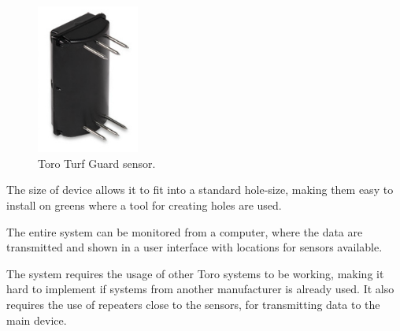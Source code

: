 \begin{figure}
\begin{center}
\includegraphics[width=0.3\textwidth]{chapters/analysis/figs/Turfguard.png}
\caption{Toro Turf Guard\texttrademark{} sensor\cite{turfGuard2}.}
\label{fig:turfguard}
\end{center}
\end{figure}

The size of device allows it to fit into a standard hole-size, making them easy to install on greens where a tool for creating holes are used\cite{turfGuard2}.

The entire system can be monitored from a computer, where the data are transmitted and shown in a user interface with locations for sensors available\cite{turfGuard2}.

The system requires the usage of other Toro systems to be working, making it hard to implement if systems from another manufacturer is already used. It also requires the use of repeaters close to the sensors, for transmitting data to the main device\cite{turfGuard2}.
